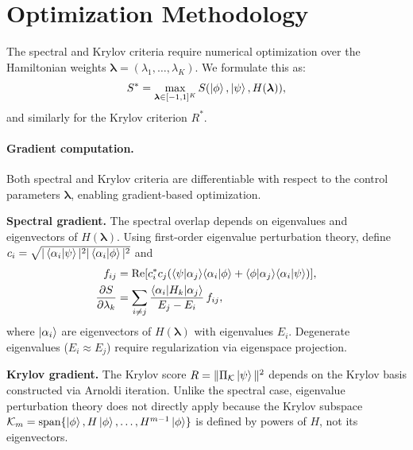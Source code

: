 \documentclass[aps,prx,reprint,superscriptaddress,footnote, twocolumn,notitlepage]{revtex4-2}
\begin{document}



\appendix

\section{Optimization Methodology}
\label{app:optimization}

The spectral and Krylov criteria require numerical optimization over the Hamiltonian weights $\boldsymbol{\lambda} = (\lambda_1, \ldots, \lambda_K)$. We formulate this as:
\begin{equation}
    S^* = \max_{\boldsymbol{\lambda} \in [-1,1]^K} S(\ket{\phi}, \ket{\psi}, H(\boldsymbol{\lambda})),
\end{equation}
and similarly for the Krylov criterion $R^*$.

\paragraph{Gradient computation.}
Both spectral and Krylov criteria are differentiable with respect to the control parameters
$\boldsymbol{\lambda}$, enabling gradient-based optimization.

\textbf{Spectral gradient.} The spectral overlap depends on eigenvalues and eigenvectors
of $H(\boldsymbol{\lambda})$. Using first-order eigenvalue perturbation theory, define
$c_i = \sqrt{|\braket{\alpha_i|\psi}|^2 |\braket{\alpha_i|\phi}|^2}$ and
\begin{align}
f_{ij} &= \text{Re}\!\left[ c_i^* c_j \!\left(
  \braket{\psi|\alpha_j}\!\braket{\alpha_i|\phi}
  + \braket{\phi|\alpha_j}\!\braket{\alpha_i|\psi}
\right)\right]\!,\notag\\
\frac{\partial S}{\partial \lambda_k}
  &= \sum_{i \neq j}
  \frac{\braket{\alpha_i | H_k | \alpha_j}}{E_j - E_i}\, f_{ij},
\label{eq:spectral_grad}
\end{align}
where $\ket{\alpha_i}$ are eigenvectors of $H(\boldsymbol{\lambda})$ with eigenvalues $E_i$.
Degenerate eigenvalues ($E_i \approx E_j$) require regularization via eigenspace projection.

\textbf{Krylov gradient.} The Krylov score $R = \|\Pi_{\mathcal{K}}\ket{\psi}\|^2$ depends
on the Krylov basis constructed via Arnoldi iteration. Unlike the spectral case,
eigenvalue perturbation theory does not directly apply because the Krylov subspace
$\mathcal{K}_m = \text{span}\{\ket{\phi}, H\ket{\phi}, \ldots, H^{m-1}\ket{\phi}\}$
is defined by powers of $H$, not its eigenvectors.
\end{document}
